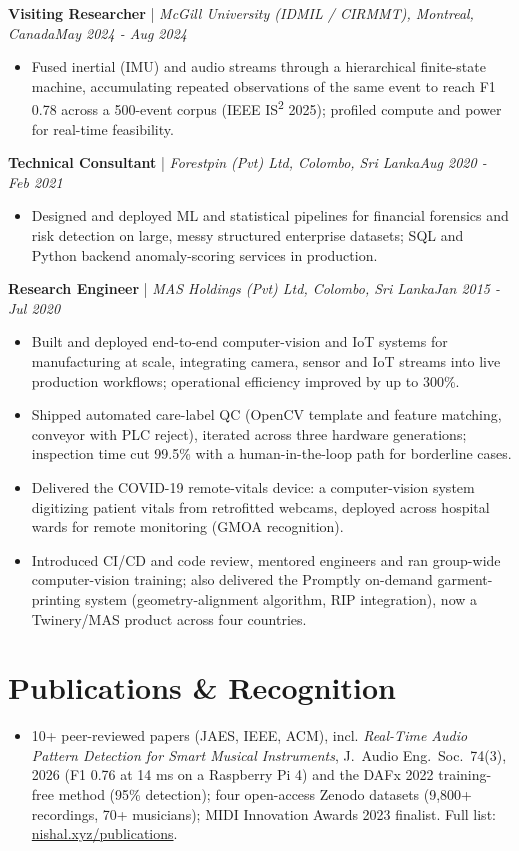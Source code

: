 \documentclass[11pt]{article}
\newenvironment{cvrole}[5]{%
  \par\noindent\textbf{\large #1} | \textit{\small #2, #3}\hfill \textit{\small #4 - #5}\par
  \begin{itemize}[leftmargin=2em, itemsep=-0.3em, topsep=-0.5em]%
}{%
  \end{itemize}\par\noindent\mbox{}\par\vspace{0.1em}%
}
\begin{document}
\begin{cvrole}{Visiting Researcher}{McGill University (IDMIL / CIRMMT)}{Montreal, Canada}{May 2024}{Aug 2024}
    \item Fused inertial (IMU) and audio streams through a hierarchical finite-state machine, accumulating repeated observations of the same event to reach F1 0.78 across a 500-event corpus (IEEE IS\textsuperscript{2} 2025); profiled compute and power for real-time feasibility.
\end{cvrole}

\begin{cvrole}{Technical Consultant}{Forestpin (Pvt) Ltd}{Colombo, Sri Lanka}{Aug 2020}{Feb 2021}
    \item Designed and deployed ML and statistical pipelines for financial forensics and risk detection on large, messy structured enterprise datasets; SQL and Python backend anomaly-scoring services in production.
\end{cvrole}

\begin{cvrole}{Research Engineer}{MAS Holdings (Pvt) Ltd}{Colombo, Sri Lanka}{Jan 2015}{Jul 2020}
    \item Built and deployed end-to-end computer-vision and IoT systems for manufacturing at scale, integrating camera, sensor and IoT streams into live production workflows; operational efficiency improved by up to 300\%.
    \item Shipped automated care-label QC (OpenCV template and feature matching, conveyor with PLC reject), iterated across three hardware generations; inspection time cut 99.5\% with a human-in-the-loop path for borderline cases.
    \item Delivered the COVID-19 remote-vitals device: a computer-vision system digitizing patient vitals from retrofitted webcams, deployed across hospital wards for remote monitoring (GMOA recognition).
    \item Introduced CI/CD and code review, mentored engineers and ran group-wide computer-vision training; also delivered the Promptly on-demand garment-printing system (geometry-alignment algorithm, RIP integration), now a Twinery/MAS product across four countries.
\end{cvrole}

\enlargethispage{3\baselineskip}
\section*{Publications \& Recognition}
\begin{itemize}[leftmargin=1.2em, itemsep=-0.25em]
    \item 10+ peer-reviewed papers (JAES, IEEE, ACM), incl. \textit{Real-Time Audio Pattern Detection for Smart Musical Instruments}, J.~Audio Eng.~Soc.~74(3), 2026 (F1 0.76 at 14 ms on a Raspberry Pi 4) and the DAFx 2022 training-free method (95\% detection); four open-access Zenodo datasets (9,800+ recordings, 70+ musicians); MIDI Innovation Awards 2023 finalist. Full list: \href{https://nishal.xyz/publications}{nishal.xyz/publications}.
\end{itemize}
\end{document}

